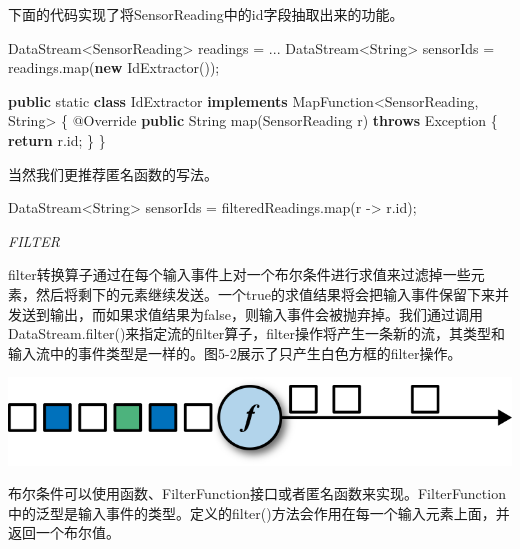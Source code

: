 \documentclass[cn,11pt,chinese]{elegantbook}
\newenvironment{Shaded}{}{}
\newcommand{\AttributeTok}[1]{\textcolor[rgb]{0.49,0.56,0.16}{#1}}
\newcommand{\BuiltInTok}[1]{#1}
\newcommand{\DataTypeTok}[1]{\textcolor[rgb]{0.56,0.13,0.00}{#1}}
\newcommand{\FunctionTok}[1]{\textcolor[rgb]{0.02,0.16,0.49}{#1}}
\newcommand{\KeywordTok}[1]{\textcolor[rgb]{0.00,0.44,0.13}{\textbf{#1}}}
\newcommand{\NormalTok}[1]{#1}
\begin{document}
下面的代码实现了将SensorReading中的id字段抽取出来的功能。

\begin{Shaded}
\begin{Highlighting}[]
\NormalTok{DataStream\textless{}SensorReading\textgreater{} readings = ...}
\NormalTok{DataStream\textless{}}\BuiltInTok{String}\NormalTok{\textgreater{} sensorIds = readings.}\FunctionTok{map}\NormalTok{(}\KeywordTok{new} \FunctionTok{IdExtractor}\NormalTok{());}

\KeywordTok{public} \DataTypeTok{static} \KeywordTok{class}\NormalTok{ IdExtractor }\KeywordTok{implements}\NormalTok{ MapFunction\textless{}SensorReading, }\BuiltInTok{String}\NormalTok{\textgreater{} \{}
    \AttributeTok{@Override}
    \KeywordTok{public} \BuiltInTok{String} \FunctionTok{map}\NormalTok{(SensorReading r) }\KeywordTok{throws} \BuiltInTok{Exception}\NormalTok{ \{}
        \KeywordTok{return}\NormalTok{ r.}\FunctionTok{id}\NormalTok{;}
\NormalTok{    \}}
\NormalTok{\}}
\end{Highlighting}
\end{Shaded}

当然我们更推荐匿名函数的写法。

\begin{Shaded}
\begin{Highlighting}[]
\NormalTok{DataStream\textless{}}\BuiltInTok{String}\NormalTok{\textgreater{} sensorIds = filteredReadings.}\FunctionTok{map}\NormalTok{(r {-}\textgreater{} r.}\FunctionTok{id}\NormalTok{);}
\end{Highlighting}
\end{Shaded}

\emph{FILTER}

filter转换算子通过在每个输入事件上对一个布尔条件进行求值来过滤掉一些元素，然后将剩下的元素继续发送。一个true的求值结果将会把输入事件保留下来并发送到输出，而如果求值结果为false，则输入事件会被抛弃掉。我们通过调用DataStream.filter()来指定流的filter算子，filter操作将产生一条新的流，其类型和输入流中的事件类型是一样的。图5-2展示了只产生白色方框的filter操作。

\includegraphics{images/spaf_0502.png}

布尔条件可以使用函数、FilterFunction接口或者匿名函数来实现。FilterFunction中的泛型是输入事件的类型。定义的filter()方法会作用在每一个输入元素上面，并返回一个布尔值。
\end{document}
